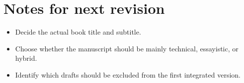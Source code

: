 \documentclass[11pt,twoside,openright]{book}
\begin{document}
\backmatter

\chapter{Notes for next revision}

\begin{itemize}
  \item Decide the actual book title and subtitle.
  \item Choose whether the manuscript should be mainly technical, essayistic, or
        hybrid.
  \item Identify which drafts should be excluded from the first integrated
        version.
\end{itemize}
\end{document}
